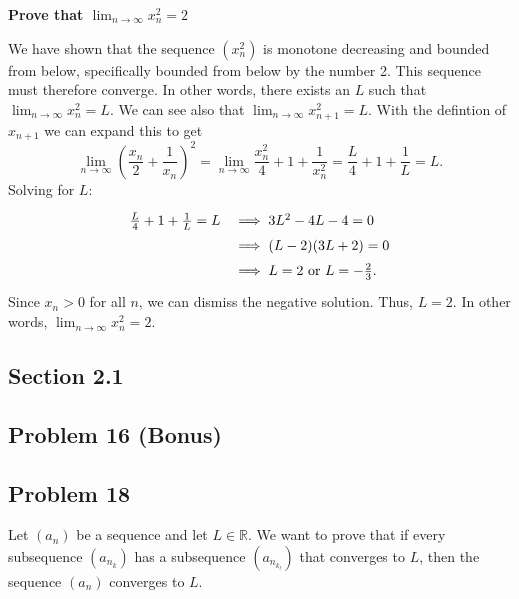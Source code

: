 \documentclass[11pt]{article}
\newcommand{\R}{\mathbb{R}}
\begin{document}
\textbf{Prove that $\displaystyle{\lim_{n\to\infty}x_n^2 = 2}$}

We have shown that the sequence $(x_n^2)$ is monotone decreasing
and bounded from below, specifically bounded from below by the number 2.
This sequence must therefore converge. In other words,
there exists an $L$ such that $\lim_{n\to\infty}x_n^2=L$. 
We can see also that $\lim_{n\to\infty}x_{n+1}^2=L$.
With the defintion of $x_{n+1}$ we can expand this to get 
\[\lim_{n\to\infty}\left(\frac{x_n}{2}+\frac{1}{x_n}\right)^2=
\lim_{n\to\infty}\frac{x_n^2}{4}+1+\frac{1}{x_n^2}=
\frac{L}{4}+1+\frac{1}{L}
=L.\]
Solving for $L$:
\[
\def\arraystretch{1.5}
\begin{array}{rl}
\frac{L}{4}+1+\frac{1}{L}=L &\implies 3L^2-4L-4=0 \\
&\implies (L-2)(3L+2)=0 \\
&\implies L=2 \textrm{ or } L=-\frac{2}{3}.
\end{array}
\]
Since $x_n > 0$ for all $n$, we can dismiss the negative solution. Thus,
$L=2$. In other words, $\lim_{n\to\infty}x_n^2=2$.

\subsection*{Section 2.1}
\subsection*{Problem 16 (Bonus)}
\subsection*{Problem 18}

Let $(a_n)$ be a sequence and let $L\in\R$. We want to prove that if every
subsequence $(a_{n_k})$ has a subsequence $(a_{n_{k_l}})$ that converges to
$L$, then the sequence $(a_n)$ converges to $L$. 
\end{document}
